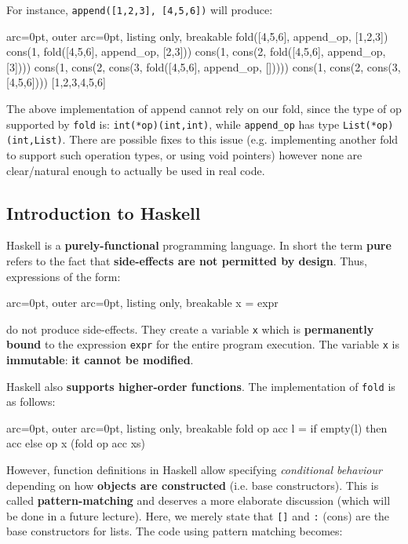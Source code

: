 For instance, \texttt{append([1,2,3], [4,5,6])} will produce:

\begin{tcblisting}{ arc=0pt, outer arc=0pt, listing only, breakable}
fold([4,5,6], append_op, [1,2,3])
cons(1, fold([4,5,6], append_op, [2,3]))
cons(1, cons(2, fold([4,5,6], append_op, [3])))
cons(1, cons(2, cons(3, fold([4,5,6], append_op, []))))
cons(1, cons(2, cons(3, [4,5,6])))
[1,2,3,4,5,6]

\end{tcblisting}


The above implementation of append cannot rely on our fold, since the type of op supported by \texttt{fold} is: \texttt{int(*op)(int,int)}, while \texttt{append\_op} has type \texttt{List(*op)(int,List)}. There are possible fixes to this issue (e.g. implementing another fold to support such operation types, or using void pointers) however none are clear/natural enough to actually be used in real code.

\subsection*{ Introduction to Haskell }

Haskell is a \textbf{purely-functional} programming language. In short the term \textbf{pure} refers to the fact that \textbf{side-effects are not permitted by design}. Thus, expressions of the form:

\begin{tcblisting}{ arc=0pt, outer arc=0pt, listing only, breakable}
x = expr

\end{tcblisting}

do not produce side-effects. They create a variable \texttt{x} which is \textbf{permanently bound} to the expression \texttt{expr} for the entire program execution. The variable \texttt{x} is \textbf{immutable}: \textbf{it cannot be modified}.

Haskell also \textbf{supports higher-order functions}. The implementation of \texttt{fold} is as follows:


\begin{tcblisting}{ arc=0pt, outer arc=0pt, listing only, breakable}
fold op acc l = if empty(l) then acc else op x (fold op acc xs)

\end{tcblisting}


However, function definitions in Haskell allow specifying \textit{conditional behaviour} depending on how \textbf{objects are constructed} (i.e. base constructors). This is called \textbf{pattern-matching} and deserves a more elaborate discussion (which will be done in a future lecture). Here, we merely state that \texttt{[]} and \texttt{:} (cons) are the base constructors for lists. The code using pattern matching becomes:


